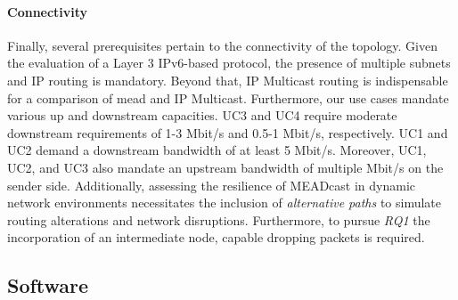 \paragraph{Connectivity} %
\label{par:Connectivity}
Finally, several prerequisites pertain to the connectivity of the topology.
Given the evaluation of a Layer 3 IPv6-based protocol, the presence of multiple
    subnets and IP routing is mandatory.
Beyond that, IP Multicast routing is indispensable for a comparison of \gls{mead}
    and IP Multicast.
Furthermore, our use cases mandate various up and downstream capacities.
UC3 and UC4 require moderate downstream requirements of 1-3 Mbit/s and 0.5-1
    Mbit/s, respectively.
UC1 and UC2 demand a downstream bandwidth of at least 5 Mbit/s.
Moreover, UC1, UC2, and UC3 also mandate an upstream bandwidth of multiple
    Mbit/s on the sender side.
Additionally, assessing the resilience of MEADcast in dynamic network
    environments necessitates the inclusion of \textit{alternative paths} to
    simulate routing alterations and network disruptions.
Furthermore, to pursue \textit{RQ1} the incorporation of an intermediate node,
    capable dropping packets is required.



\subsection{Software} %
\label{sub:Software}
\label{sub:Requirements}

